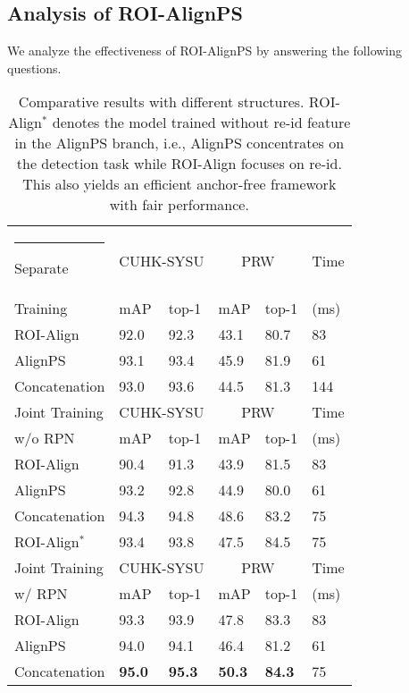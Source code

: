 \documentclass[journal]{IEEEtran}
\makeatletter
\newcommand{\thickhline}{\noalign {\ifnum 0=`}\fi \hrule height 1pt
    \futurelet \reserved@a \@xhline
}
\makeatother
\begin{document}
\subsection{Analysis of ROI-AlignPS}\label{sec:ana-r}
We analyze the effectiveness of ROI-AlignPS by answering the following questions.

\begin{table}[t]
\small
\centering
\begin{tabular}{p{2.2cm}|p{0.8cm}<{\centering}p{0.8cm}<{\centering}|p{0.8cm}<{\centering}p{0.8cm}<{\centering}|p{0.7cm}<{\centering}}
\hline\thickhline
\rowcolor{mygray} \rowcolor{mygray} 
 {Separate} & \multicolumn{2}{c|}{CUHK-SYSU} & \multicolumn{2}{c|}{PRW}  & \multicolumn{1}{c}{Time}   \\ \cline{2-5} 
\rowcolor{mygray} 
{Training}  & mAP & top-1  & mAP  & top-1 & (ms) \\  \hline \hline   
ROI-Align
   & 92.0   & 92.3       & 43.1   & 80.7 & 83\\
AlignPS  & 93.1   & 93.4       & 45.9   & 81.9  & 61\\ 
Concatenation & 93.0 & 93.6 & 44.5    & 81.3 & 144\\\hline
\rowcolor{mygray} \rowcolor{mygray} 
 {Joint Training}  & \multicolumn{2}{c|}{CUHK-SYSU} & \multicolumn{2}{c|}{PRW}  &{Time}  \\ \cline{2-5} 
\rowcolor{mygray} 
{w/o RPN}  & mAP & top-1  & mAP  & top-1 & (ms) \\  \hline \hline    
ROI-Align
   & 90.4   &   91.3     & 43.9   & 81.5 & 83\\
AlignPS  & 93.2   & 92.8       &44.9   & 80.0  & 61\\ 
Concatenation  &94.3 & 94.8 & 48.6    & 83.2 & 75\\ \hdashline
ROI-Align$^{*}$
   & 93.4   & 93.8       & 47.5   & 84.5 & 75\\
\hline
\rowcolor{mygray} \rowcolor{mygray} 
{Joint Training}  & \multicolumn{2}{c|}{CUHK-SYSU} & \multicolumn{2}{c|}{PRW}  &{Time}  \\ \cline{2-5} 
\rowcolor{mygray} 
{w/ RPN}  & mAP & top-1  & mAP  & top-1 & (ms) \\  \hline \hline     
ROI-Align
   & 93.3   &   93.9     & 47.8   & 83.3 & 83\\
AlignPS  & 94.0   & 94.1       &46.4   & 81.2  & 61\\ 
Concatenation  &\textbf{95.0} & \textbf{95.3} & \textbf{50.3}    & \textbf{84.3} & 75\\\hline
\end{tabular}
\caption{Comparative results with different structures. ROI-Align$^{*}$ denotes the model trained without re-id feature in the AlignPS branch, i.e., AlignPS concentrates on the detection task while ROI-Align focuses on re-id. This also yields an efficient anchor-free framework with fair performance. }
\label{tab:rbn}
\end{table}
\end{document}
